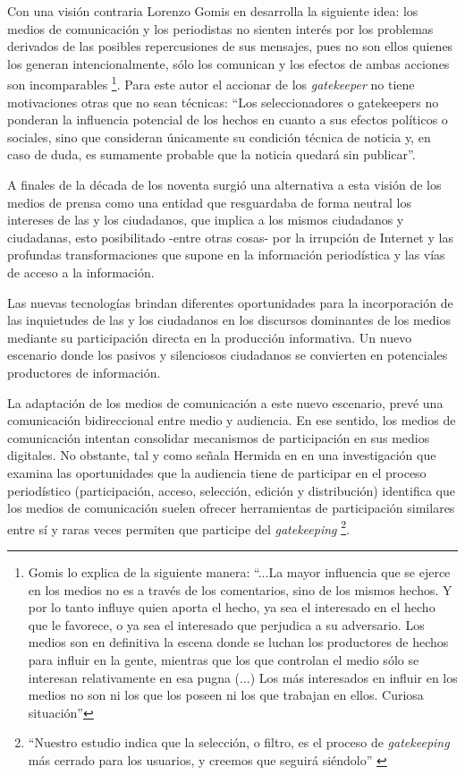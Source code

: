 Con una visión contraria Lorenzo Gomis en \cite{gomis1991teor} desarrolla la siguiente idea: los medios de comunicación y los periodistas no sienten interés por los problemas derivados de las posibles repercusiones de sus mensajes, pues no son ellos quienes los generan intencionalmente, sólo los comunican y los efectos de ambas acciones son incomparables \footnote{ Gomis lo explica de la siguiente manera: ``...La mayor influencia que se ejerce en los medios no es a través de los comentarios, sino de los mismos hechos. Y por lo tanto influye quien aporta el hecho, ya sea el interesado en el hecho que le favorece, o ya sea el interesado que perjudica a su adversario. Los medios son en definitiva la escena donde se luchan los productores de hechos para influir en la gente, mientras que los que controlan el medio sólo se interesan relativamente en esa pugna (...) Los más interesados en influir en los medios no son ni los que los poseen ni los que trabajan en ellos. Curiosa situación''}. Para este autor el accionar de los \emph{gatekeeper} no tiene motivaciones otras que no sean técnicas: ``Los seleccionadores o gatekeepers no ponderan la influencia potencial de los hechos en cuanto a sus efectos políticos o sociales, sino que consideran únicamente su condición técnica de noticia y, en caso de duda, es sumamente probable que la noticia quedará sin publicar''.

A finales de la década de los noventa surgió una alternativa a esta visión de los medios de prensa como una entidad que resguardaba de forma neutral los intereses de las y los ciudadanos, que implica a los mismos ciudadanos y ciudadanas, esto posibilitado -entre otras cosas- por la irrupción de Internet y las profundas transformaciones que supone en la información periodística y las vías de acceso a la información.

Las nuevas tecnologías brindan diferentes oportunidades para la incorporación de las inquietudes de las y los ciudadanos en los discursos dominantes de los medios mediante su participación directa en la producción informativa. Un nuevo escenario donde los pasivos y silenciosos ciudadanos se convierten en potenciales productores de información.

La adaptación de los medios de comunicación a este nuevo escenario, prevé una comunicación bidireccional entre medio y audiencia. En ese sentido, los medios de comunicación intentan consolidar mecanismos de participación en sus medios digitales. No obstante, tal y como señala Hermida en \cite{doi17512781003640703} en una investigación que examina las oportunidades que la audiencia tiene de participar en el proceso periodístico (participación, acceso, selección, edición y distribución) identifica que los medios de comunicación suelen ofrecer herramientas de participación similares entre sí y raras veces permiten que participe del \emph{gatekeeping} \footnote{``Nuestro estudio indica que la selección, o filtro, es el proceso de \emph{gatekeeping} más cerrado para los usuarios, y creemos que seguirá siéndolo'' \cite{doi17512781003640703}}. %

